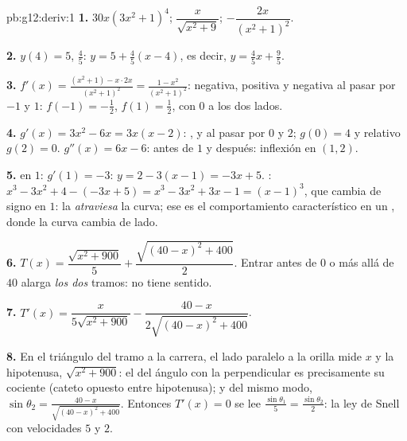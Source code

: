 \begin{solution}{pb:g12:deriv:1}
\textbf{1.} $30x\left(3x^2 + 1\right)^4$; \quad
$\dfrac{x}{\sqrt{x^2 + 9}}$; \quad
$-\dfrac{2x}{\left(x^2 + 1\right)^2}$.

\textbf{2.} $y(4) = 5$,  $\frac45$: 
$y = 5 + \frac45(x - 4)$, es decir, $y = \frac45 x + \frac95$.

\textbf{3.} $f'(x) = \frac{(x^2 + 1) - x \cdot 2x}{(x^2+1)^2}
= \frac{1 - x^2}{(x^2 + 1)^2}$: negativa, positiva y negativa al pasar por
$-1$ y $1$:  $f(-1) = -\frac12$,  $f(1) = \frac12$, con
 $0$ a los dos lados.

\textbf{4.} $g'(x) = 3x^2 - 6x = 3x(x - 2)$: ,  y
 al pasar por $0$ y $2$;  $g(0) = 4$ y 
relativo $g(2) = 0$. $g''(x) = 6x - 6$:  antes de $1$ y 
después: inflexión en $(1, 2)$.

\textbf{5.}  en $1$:  $g'(1) = -3$:
$y = 2 - 3(x - 1) = -3x + 5$. :
$x^3 - 3x^2 + 4 - (-3x + 5) = x^3 - 3x^2 + 3x - 1 = (x - 1)^3$, que cambia
de signo en $1$: la  \emph{atraviesa} la curva; ese es el
comportamiento característico en un , donde la curva
cambia de lado.

\textbf{6.} $T(x) = \dfrac{\sqrt{x^2 + 900}}{5} +
\dfrac{\sqrt{(40 - x)^2 + 400}}{2}$. Entrar antes de $0$ o más allá de
$40$ alarga \emph{los dos} tramos: no tiene sentido.

\textbf{7.} $T'(x) = \dfrac{x}{5\sqrt{x^2 + 900}} -
\dfrac{40 - x}{2\sqrt{(40 - x)^2 + 400}}$.

\textbf{8.} En el triángulo del tramo a la carrera, el lado paralelo a la
orilla mide $x$ y la hipotenusa, $\sqrt{x^2 + 900}$: el  del ángulo con
la perpendicular es precisamente su cociente (cateto opuesto entre
hipotenusa); y del mismo modo,
$\sin\theta_2 = \frac{40 - x}{\sqrt{(40-x)^2 + 400}}$. Entonces
$T'(x) = 0$ se lee $\frac{\sin\theta_1}{5} = \frac{\sin\theta_2}{2}$: la
ley de Snell con velocidades $5$ y $2$.


\end{solution}
